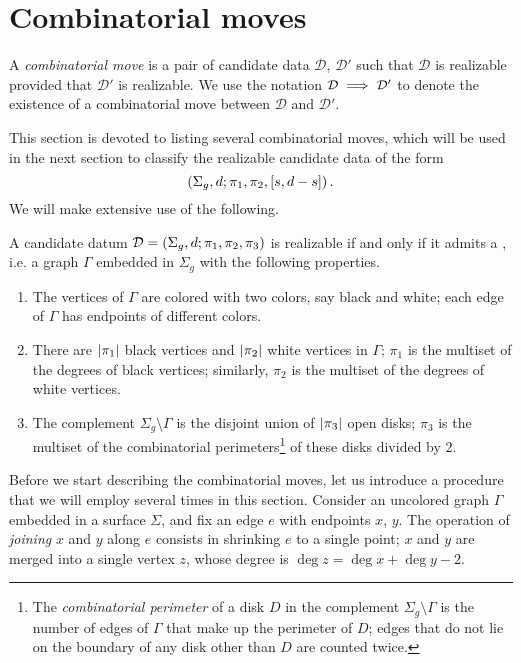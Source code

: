 \documentclass{article}
\begin{document}
\section{Combinatorial moves}

\begin{definition}
A \emph{combinatorial move} is a pair of candidate data $\mathcal{D}$, $\mathcal{D}'$ such that $\mathcal{D}$ is realizable provided that $\mathcal{D}'$ is realizable. We use the notation $\mathcal{D}\implies\mathcal{D}'$ to denote the existence of a combinatorial move between $\mathcal{D}$ and $\mathcal{D}'$.
\end{definition}

This section is devoted to listing several combinatorial moves, which will be used in the next section to classify the realizable candidate data of the form
\[
\left(\Sigma_g,d;\pi_1,\pi_2,[s,d-s]\right).
\]
We will make extensive use of the following.

\begin{fact*}
A candidate datum $\mathcal{D}=\left(\Sigma_g,d;\pi_1,\pi_2,\pi_3\right)$ is realizable if and only if it admits a \dessin{}, i.e. a graph $\Gamma$ embedded in $\Sigma_g$ with the following properties.
\begin{enumerate}
\item The vertices of $\Gamma$ are colored with two colors, say black and white; each edge of $\Gamma$ has endpoints of different colors.
\item There are $\left|\pi_1\right|$ black vertices and $\left|\pi_2\right|$ white vertices in $\Gamma$; $\pi_1$ is the multiset of the degrees of black vertices; similarly, $\pi_2$ is the multiset of the degrees of white vertices.
\item The complement $\Sigma_g\setminus\Gamma$ is the disjoint union of $\left|\pi_3\right|$ open disks; $\pi_3$ is the multiset of the combinatorial perimeters\footnote{The \emph{combinatorial perimeter} of a disk $D$ in the complement $\Sigma_g\setminus\Gamma$ is the number of edges of $\Gamma$ that make up the perimeter of $D$; edges that do not lie on the boundary of any disk other than $D$ are counted twice.} of these disks divided by $2$.
\end{enumerate}
\end{fact*}

Before we start describing the combinatorial moves, let us introduce a procedure that we will employ several times in this section. Consider an uncolored graph $\Gamma$ embedded in a surface $\Sigma$, and fix an edge $e$ with endpoints $x$, $y$. The operation of \emph{joining} $x$ and $y$ along $e$ consists in shrinking $e$ to a single point; $x$ and $y$ are merged into a single vertex $z$, whose degree is $\deg{z}=\deg{x}+\deg{y}-2$.
\end{document}
